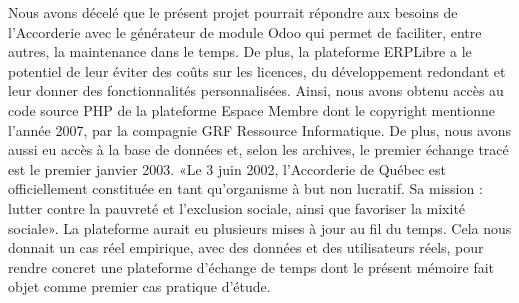 




Nous avons décelé que le présent projet pourrait répondre aux besoins de l'Accorderie avec le générateur de module Odoo qui permet de faciliter, entre autres, la maintenance dans le temps. De plus, la plateforme ERPLibre a le potentiel de leur éviter des coûts sur les licences, du développement redondant et leur donner des fonctionnalités personnalisées. Ainsi, nous avons obtenu accès au code source PHP de la plateforme Espace Membre dont le copyright mentionne l’année 2007, par la compagnie GRF Ressource Informatique. De plus, nous avons aussi eu accès à la base de données et, selon les archives, le premier échange tracé est le premier janvier 2003. «Le 3 juin 2002, l’Accorderie de Québec est officiellement constituée en tant qu’organisme à but non lucratif. Sa mission : lutter contre la pauvreté et l’exclusion sociale, ainsi que favoriser la mixité sociale»\cite{erudit_accorderie_2014}. La plateforme aurait eu plusieurs mises à jour au fil du temps. Cela nous donnait un cas réel empirique, avec des données et des utilisateurs réels, pour rendre concret une plateforme d'échange de temps dont le présent mémoire fait objet comme premier cas pratique d'étude.

